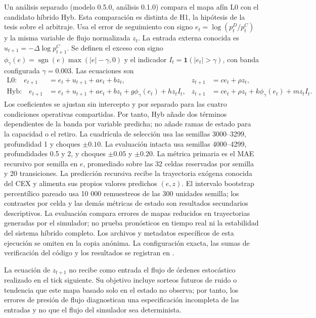 Un análisis separado (modelo 0.5.0, análisis 0.1.0) compara el mapa afín L0 con el candidato híbrido Hyb. Esta comparación es distinta de H1, la hipótesis de la tesis sobre el arbitraje. Usa el error de seguimiento con signo $e_t=\log(p_t^D/p_t^C)$ y la misma variable de flujo normalizada $z_t$. La entrada externa conocida es $u_{t+1}=-\Delta\log p^C_{t+1}$. Se definen el exceso con signo $\phi_\gamma(e)=\operatorname{sgn}(e)\max(|e|-\gamma,0)$ y el indicador $I_t=\mathbf{1}(|e_t|>\gamma)$, con banda configurada $\gamma=0.003$. Las ecuaciones son
\begin{align}
  \text{L0:}\quad e_{t+1}&=e_t+u_{t+1}+a e_t+b z_t,& z_{t+1}&=c e_t+\rho z_t,\\
  \text{Hyb:}\quad e_{t+1}&=e_t+u_{t+1}+a e_t+b z_t+g\phi_\gamma(e_t)+h z_t I_t,&
  z_{t+1}&=c e_t+\rho z_t+k\phi_\gamma(e_t)+m z_t I_t.
\end{align}
Los coeficientes se ajustan sin intercepto y por separado para las cuatro condiciones operativas compartidas. Por tanto, Hyb añade dos términos dependientes de la banda por variable predicha; no añade ramas de estado para la capacidad o el retiro. La cuadrícula de selección usa las semillas 3000--3299, profundidad 1 y choques $\pm0.10$. La evaluación intacta usa semillas 4000--4299, profundidades 0.5 y 2, y choques $\pm0.05$ y $\pm0.20$. La métrica primaria es el MAE recursivo por semilla en $e$, promediado sobre las 32 celdas reservadas por semilla y 20 transiciones. La predicción recursiva recibe la trayectoria exógena conocida del CEX y alimenta sus propios valores predichos $(e,z)$. El intervalo bootstrap percentílico pareado usa 10 000 remuestreos de las 300 unidades semilla; los contrastes por celda y las demás métricas de estado son resultados secundarios descriptivos. La evaluación compara errores de mapas reducidos en trayectorias generadas por el simulador; no prueba pronósticos en tiempo real ni la estabilidad del sistema híbrido completo.
\ifdefined\blindreviewmode
Los archivos y metadatos específicos de esta ejecución se omiten en la copia anónima.
\else
La configuración exacta, las sumas de verificación del código y los resultados se registran en .
\fi

La ecuación de $z_{t+1}$ no recibe como entrada el flujo de órdenes estocástico realizado en el tick siguiente. Su objetivo incluye sorteos futuros de ruido o tendencia que este mapa basado solo en el estado no observa; por tanto, los errores de presión de flujo diagnostican una especificación incompleta de las entradas y no que el flujo del simulador sea determinista.

